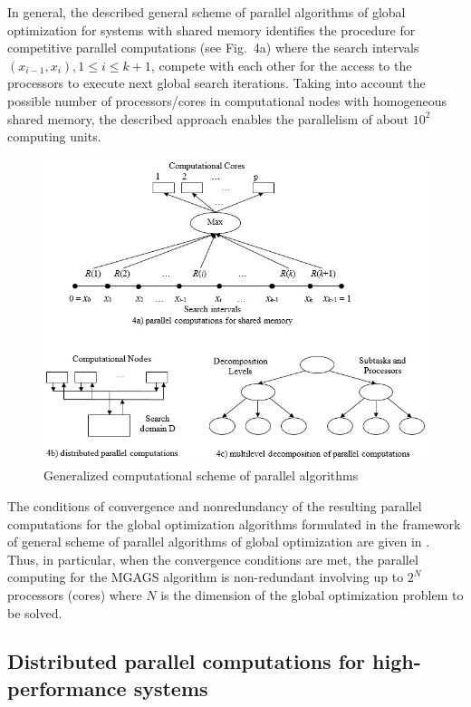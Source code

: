 \documentclass[
11pt,%
tightenlines,%
twoside,%
onecolumn,%
nofloats,%
nobibnotes,%
nofootinbib,%
superscriptaddress,%
noshowpacs,%
centertags]%
{revtex4}
\begin{document}
In general, the described general scheme of parallel algorithms of global optimization for systems with shared memory identifies the procedure for competitive parallel computations (see Fig.~4a) where the search intervals $(x_{i-1} ,x_i), 1 \leq i \leq k + 1$, compete with each other for the access to the processors to execute next global search iterations. Taking into account the possible number of processors/cores in computational nodes with homogeneous shared memory, the described approach enables the parallelism of about $10^2$ computing units.

\begin{figure}[t]
\centering
\includegraphics[width=13.0cm]{Fig4}
\caption{Generalized computational scheme of parallel algorithms}
\label{fig:Fig4}
\end{figure}

The conditions of convergence and nonredundancy of the resulting parallel computations for the global optimization algorithms formulated in the framework of general scheme of parallel algorithms of global optimization are given in \cite{Strongin1, Strongin2, Strongin4, Grishagin2}. Thus, in particular, when the convergence conditions are met, the parallel computing for the MGAGS algorithm is non-redundant involving up to $2^N$ processors (cores) where $N$ is the dimension of the global optimization problem to be solved.

\subsection{Distributed parallel computations for high-performance systems}
\end{document}
